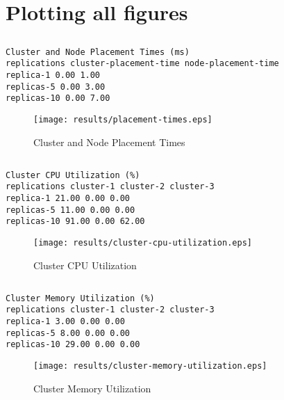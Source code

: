 \documentclass{elsart}
\begin{document}
\section{Plotting all figures}
\subsection{}

\begin{lstlisting}[caption={Cluster and Node Placement Times}]
Cluster and Node Placement Times (ms)
replications cluster-placement-time node-placement-time
replica-1 0.00 1.00
replicas-5 0.00 3.00
replicas-10 0.00 7.00
\end{lstlisting}

\begin{figure}[ht]
\centering
\texttt{[image: results/placement-times.eps]}
\caption{Cluster and Node Placement Times}\label{fig:placement-times.eps}
\end{figure}

\subsection{}

\begin{lstlisting}[caption={Cluster CPU Utilization}]
Cluster CPU Utilization (%)
replications cluster-1 cluster-2 cluster-3
replica-1 21.00 0.00 0.00
replicas-5 11.00 0.00 0.00
replicas-10 91.00 0.00 62.00
\end{lstlisting}

\begin{figure}[ht]
\centering
\texttt{[image: results/cluster-cpu-utilization.eps]}
\caption{Cluster CPU Utilization}\label{fig:cluster-cpu-utilization.eps}
\end{figure}

\subsection{}

\begin{lstlisting}[caption={Cluster Memory Utilization}]
Cluster Memory Utilization (%)
replications cluster-1 cluster-2 cluster-3
replica-1 3.00 0.00 0.00
replicas-5 8.00 0.00 0.00
replicas-10 29.00 0.00 0.00
\end{lstlisting}

\begin{figure}[ht]
\centering
\texttt{[image: results/cluster-memory-utilization.eps]}
\caption{Cluster Memory Utilization}\label{fig:cluster-memory-utilization.eps}
\end{figure}
\end{document}
